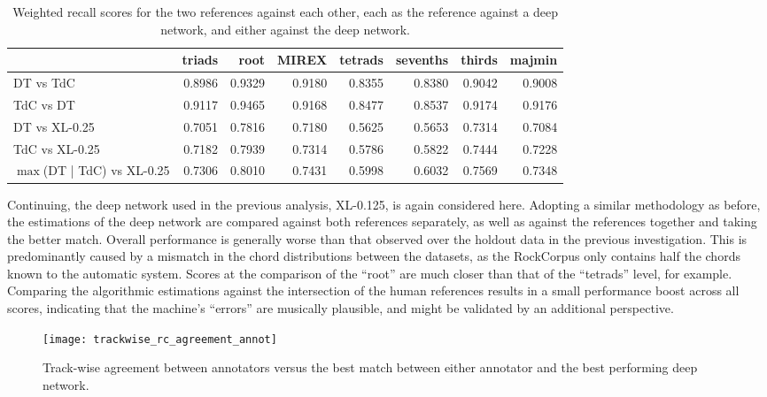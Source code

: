 \begin{table}[t]
\begin{center}
\scriptsize
\caption{Weighted recall scores for the two references against each other, each as the reference against a deep network, and either against the deep network.}

\begin{tabular}{lrrrrrrr}
\hline
         &   triads &   root &   MIREX &   tetrads &   sevenths &   thirds &   majmin \\
\hline
DT vs TdC  &  0.8986 & 0.9329 &  0.9180  &   0.8355  &    0.8380  &   0.9042  &  0.9008 \\
TdC vs DT &   0.9117 & 0.9465 &  0.9168  &   0.8477  &    0.8537 &   0.9174 &    0.9176 \\
\hline
DT vs XL-0.25  &   0.7051 & 0.7816 &  0.7180  &   0.5625   &   0.5653  &  0.7314  &  0.7084 \\
TdC vs XL-0.25  & 0.7182 & 0.7939 & 0.7314  &   0.5786  &    0.5822 &   0.7444 &   0.7228 \\
\hline
$\max$(DT | TdC) vs XL-0.25 & 0.7306 & 0.8010 & 0.7431  &   0.5998  &    0.6032 &   0.7569  &  0.7348\\
\hline
\end{tabular}
\label{tab:rc_agreement}
\end{center}
\end{table}

Continuing, the deep network used in the previous analysis, XL-0.125, is again considered here.
Adopting a similar methodology as before, the estimations of the deep network are compared against both references separately, as well as against the references together and taking the better match.
Overall performance is generally worse than that observed over the holdout data in the previous investigation.
This is predominantly caused by a mismatch in the chord distributions between the datasets, as the RockCorpus only contains half the chords known to the automatic system.
Scores at the comparison of the ``root'' are much closer than that of the ``tetrads'' level, for example.
Comparing the algorithmic estimations against the intersection of the human references results in a small performance boost across all scores, indicating that the machine's ``errors'' are musically plausible, and might be validated by an additional perspective.


\begin{figure}[t!]
\centering
\texttt{[image: trackwise\_rc\_agreement\_annot]}
\caption{Track-wise agreement between annotators versus the best match between either annotator and the best performing deep network.}
\label{fig:trackwise_rc_agreement}
\end{figure}

